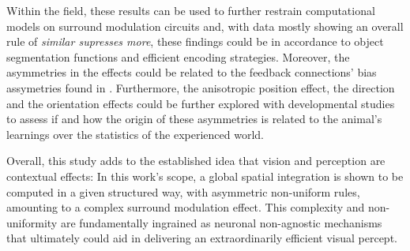Within the field, these results can be used to further restrain computational models on surround modulation circuits and, with data mostly showing an overall rule of \textit{similar supresses more}, these findings could be in accordance to object segmentation functions and efficient encoding strategies. Moreover, the asymmetries in the effects could be related to the feedback connections' bias assymetries found in \cite{Marques2018}. Furthermore, the anisotropic position effect, the direction and the orientation effects could be further explored with developmental studies to assess if and how the origin of these asymmetries is related to the animal's learnings over the statistics of the experienced world.

Overall, this study adds to the established idea that vision and perception are contextual effects: In this work's scope, a global spatial integration is shown to be computed in a given structured way, with asymmetric non-uniform rules, amounting to a complex surround modulation effect. This complexity and non-uniformity are fundamentally ingrained as neuronal non-agnostic mechanisms that ultimately could aid in delivering an extraordinarily efficient visual percept.

\clearpage